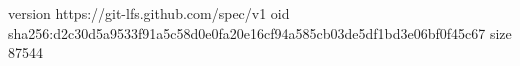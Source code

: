 version https://git-lfs.github.com/spec/v1
oid sha256:d2c30d5a9533f91a5c58d0e0fa20e16cf94a585cb03de5df1bd3e06bf0f45c67
size 87544
